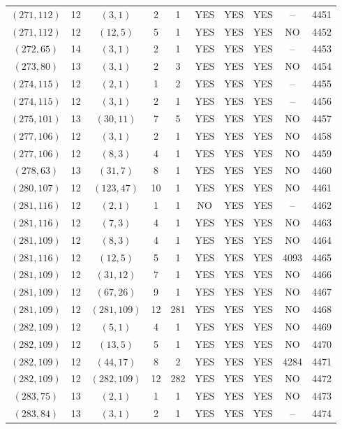 \begin{longtable}{|c|c|c|c|c|c|c|c|c|c|}
$(271, 112)$ & 12 & $(3, 1)$ & 2 & 1 & YES & YES & YES & -- & 4451\\
$(271, 112)$ & 12 & $(12, 5)$ & 5 & 1 & YES & YES & YES & NO & 4452\\
$(272, 65)$ & 14 & $(3, 1)$ & 2 & 1 & YES & YES & YES & -- & 4453\\
$(273, 80)$ & 13 & $(3, 1)$ & 2 & 3 & YES & YES & YES & NO & 4454\\
$(274, 115)$ & 12 & $(2, 1)$ & 1 & 2 & YES & YES & YES & -- & 4455\\
$(274, 115)$ & 12 & $(3, 1)$ & 2 & 1 & YES & YES & YES & -- & 4456\\
$(275, 101)$ & 13 & $(30, 11)$ & 7 & 5 & YES & YES & YES & NO & 4457\\
$(277, 106)$ & 12 & $(3, 1)$ & 2 & 1 & YES & YES & YES & NO & 4458\\
$(277, 106)$ & 12 & $(8, 3)$ & 4 & 1 & YES & YES & YES & NO & 4459\\
$(278, 63)$ & 13 & $(31, 7)$ & 8 & 1 & YES & YES & YES & NO & 4460\\
$(280, 107)$ & 12 & $(123, 47)$ & 10 & 1 & YES & YES & YES & NO & 4461\\
$(281, 116)$ & 12 & $(2, 1)$ & 1 & 1 & NO & YES & YES & -- & 4462\\
$(281, 116)$ & 12 & $(7, 3)$ & 4 & 1 & YES & YES & YES & NO & 4463\\
$(281, 109)$ & 12 & $(8, 3)$ & 4 & 1 & YES & YES & YES & NO & 4464\\
$(281, 116)$ & 12 & $(12, 5)$ & 5 & 1 & YES & YES & YES & 4093 & 4465\\
$(281, 109)$ & 12 & $(31, 12)$ & 7 & 1 & YES & YES & YES & NO & 4466\\
$(281, 109)$ & 12 & $(67, 26)$ & 9 & 1 & YES & YES & YES & NO & 4467\\
$(281, 109)$ & 12 & $(281, 109)$ & 12 & 281 & YES & YES & YES & NO & 4468\\
$(282, 109)$ & 12 & $(5, 1)$ & 4 & 1 & YES & YES & YES & NO & 4469\\
$(282, 109)$ & 12 & $(13, 5)$ & 5 & 1 & YES & YES & YES & NO & 4470\\
$(282, 109)$ & 12 & $(44, 17)$ & 8 & 2 & YES & YES & YES & 4284 & 4471\\
$(282, 109)$ & 12 & $(282, 109)$ & 12 & 282 & YES & YES & YES & NO & 4472\\
$(283, 75)$ & 13 & $(2, 1)$ & 1 & 1 & YES & YES & YES & NO & 4473\\
$(283, 84)$ & 13 & $(3, 1)$ & 2 & 1 & YES & YES & YES & -- & 4474\\

\end{longtable}

